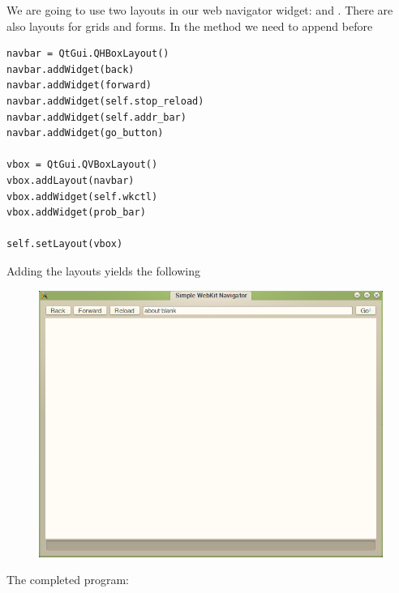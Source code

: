 We are going to use two layouts in our web navigator widget:  and .  There are also layouts for grids and forms.  In the  method we need to append before 
\begin{lstlisting}
navbar = QtGui.QHBoxLayout()
navbar.addWidget(back)
navbar.addWidget(forward)
navbar.addWidget(self.stop_reload)
navbar.addWidget(self.addr_bar)
navbar.addWidget(go_button)

vbox = QtGui.QVBoxLayout()
vbox.addLayout(navbar)
vbox.addWidget(self.wkctl)
vbox.addWidget(prob_bar)

self.setLayout(vbox)
\end{lstlisting}
Adding the layouts yields the following
\begin{figure}[H]
\centering
\includegraphics[scale=.5]{layout.png}
\end{figure}

The completed program:



